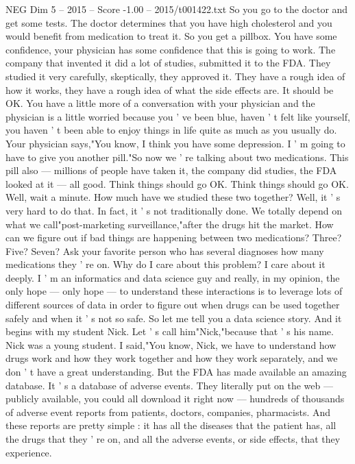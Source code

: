 \begin{textsample}{NEG Dim 5 – 2015 – Score -1.00 – 2015/t001422.txt}  \label{ex:f5_neg_030}
So you go to the doctor and get some tests.
The doctor determines that you have high cholesterol and you would benefit from medication to treat it.
So you get a pillbox.
You have some confidence, your physician has some confidence that this is going to work.
The company that invented it did a lot of studies, submitted it to the FDA.
They studied it very carefully, skeptically, they approved it.
They have a rough idea of how it works, they have a rough idea of what the side effects are.
It should be OK.
You have a little more of a conversation with your physician and the physician is a little worried because you ' ve been blue, haven ' t felt like yourself, you haven ' t been able to enjoy things in life quite as much as you usually do.
Your physician says,"You know, I think you have some depression.
I ' m going to have to give you another pill."So now we ' re talking about two medications.
This pill also — millions of people have taken it, the company did studies, the FDA looked at it — all good.
Think things should go OK.
Think things should go OK.
Well, wait a minute.
How much have we studied these two together?
Well, it ' s very hard to do that.
In fact, it ' s not traditionally done.
We totally depend on what we call"post-marketing surveillance,"after the drugs hit the market.
How can we figure out if bad things are happening between two medications?
Three?
Five?
Seven?
Ask your favorite person who has several diagnoses how many medications they ' re on.
Why do I care about this problem?
I care about it deeply.
I ' m an informatics and data science guy and really, in my opinion, the only hope — only hope — to understand these interactions is to leverage lots of different sources of data in order to figure out when drugs can be used together safely and when it ' s not so safe.
So let me tell you a data science story.
And it begins with my student Nick.
Let ' s call him"Nick,"because that ' s his name.
Nick was a young student.
I said,"You know, Nick, we have to understand how drugs work and how they work together and how they work separately, and we don ' t have a great understanding.
But the FDA has made available an amazing database.
It ' s a database of adverse events.
They literally put on the web — publicly available, you could all download it right now — hundreds of thousands of adverse event reports from patients, doctors, companies, pharmacists.
And these reports are pretty simple : it has all the diseases that the patient has, all the drugs that they ' re on, and all the adverse events, or side effects, that they experience.

\end{textsample}
